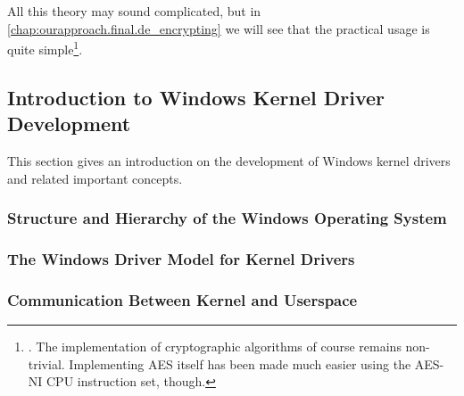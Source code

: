 All this theory may sound complicated, but in \autoref{chap:ourapproach.final.de_encrypting} we will see that the practical usage is quite simple\footnote{\label{fn:background.luks2.simplecryptography}. The implementation of cryptographic algorithms of course remains non-trivial. Implementing AES itself has been made much easier using the AES-NI CPU instruction set, though.}.

\subsection{Introduction to Windows Kernel Driver Development}
\label{chap:background.kerneldriver}
This section gives an introduction on the development of Windows kernel drivers and related important concepts.

\subsubsection{Structure and Hierarchy of the Windows Operating System}
\label{chap:background.kerneldriver.oshierarchy}

\subsubsection{The Windows Driver Model for Kernel Drivers}
\label{chap:background.kerneldriver.wdm}

\subsubsection{Communication Between Kernel and Userspace}
\label{chap:background.kerneldriver.communication}
